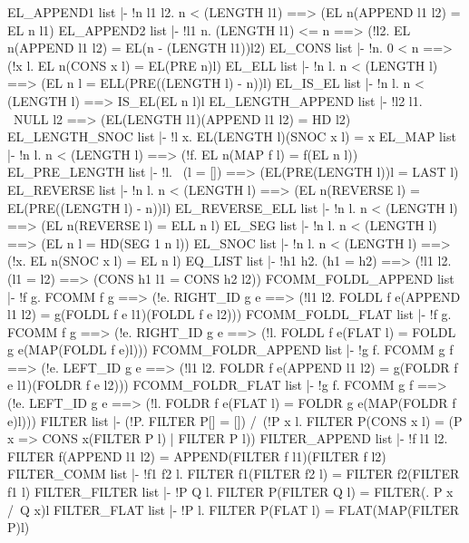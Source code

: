 \ENDTHEOREM
\THEOREM EL\_APPEND1 list
|- !n l1 l2. n < (LENGTH l1) ==> (EL n(APPEND l1 l2) = EL n l1)
\ENDTHEOREM
\THEOREM EL\_APPEND2 list
|- !l1 n.
    (LENGTH l1) <= n ==>
    (!l2. EL n(APPEND l1 l2) = EL(n - (LENGTH l1))l2)
\ENDTHEOREM
\THEOREM EL\_CONS list
|- !n. 0 < n ==> (!x l. EL n(CONS x l) = EL(PRE n)l)
\ENDTHEOREM
\THEOREM EL\_ELL list
|- !n l. n < (LENGTH l) ==> (EL n l = ELL(PRE((LENGTH l) - n))l)
\ENDTHEOREM
\THEOREM EL\_IS\_EL list
|- !n l. n < (LENGTH l) ==> IS_EL(EL n l)l
\ENDTHEOREM
\THEOREM EL\_LENGTH\_APPEND list
|- !l2 l1. ~NULL l2 ==> (EL(LENGTH l1)(APPEND l1 l2) = HD l2)
\ENDTHEOREM
\THEOREM EL\_LENGTH\_SNOC list
|- !l x. EL(LENGTH l)(SNOC x l) = x
\ENDTHEOREM
\THEOREM EL\_MAP list
|- !n l. n < (LENGTH l) ==> (!f. EL n(MAP f l) = f(EL n l))
\ENDTHEOREM
\THEOREM EL\_PRE\_LENGTH list
|- !l. ~(l = []) ==> (EL(PRE(LENGTH l))l = LAST l)
\ENDTHEOREM
\THEOREM EL\_REVERSE list
|- !n l. n < (LENGTH l) ==> (EL n(REVERSE l) = EL(PRE((LENGTH l) - n))l)
\ENDTHEOREM
\THEOREM EL\_REVERSE\_ELL list
|- !n l. n < (LENGTH l) ==> (EL n(REVERSE l) = ELL n l)
\ENDTHEOREM
\THEOREM EL\_SEG list
|- !n l. n < (LENGTH l) ==> (EL n l = HD(SEG 1 n l))
\ENDTHEOREM
\THEOREM EL\_SNOC list
|- !n l. n < (LENGTH l) ==> (!x. EL n(SNOC x l) = EL n l)
\ENDTHEOREM
\THEOREM EQ\_LIST list
|- !h1 h2.
    (h1 = h2) ==> (!l1 l2. (l1 = l2) ==> (CONS h1 l1 = CONS h2 l2))
\ENDTHEOREM
\THEOREM FCOMM\_FOLDL\_APPEND list
|- !f g.
    FCOMM f g ==>
    (!e.
      RIGHT_ID g e ==>
      (!l1 l2. FOLDL f e(APPEND l1 l2) = g(FOLDL f e l1)(FOLDL f e l2)))
\ENDTHEOREM
\THEOREM FCOMM\_FOLDL\_FLAT list
|- !f g.
    FCOMM f g ==>
    (!e.
      RIGHT_ID g e ==>
      (!l. FOLDL f e(FLAT l) = FOLDL g e(MAP(FOLDL f e)l)))
\ENDTHEOREM
\THEOREM FCOMM\_FOLDR\_APPEND list
|- !g f.
    FCOMM g f ==>
    (!e.
      LEFT_ID g e ==>
      (!l1 l2. FOLDR f e(APPEND l1 l2) = g(FOLDR f e l1)(FOLDR f e l2)))
\ENDTHEOREM
\THEOREM FCOMM\_FOLDR\_FLAT list
|- !g f.
    FCOMM g f ==>
    (!e.
      LEFT_ID g e ==>
      (!l. FOLDR f e(FLAT l) = FOLDR g e(MAP(FOLDR f e)l)))
\ENDTHEOREM
\THEOREM FILTER list
|- (!P. FILTER P[] = []) /\
   (!P x l.
     FILTER P(CONS x l) = (P x => CONS x(FILTER P l) | FILTER P l))
\ENDTHEOREM
\THEOREM FILTER\_APPEND list
|- !f l1 l2. FILTER f(APPEND l1 l2) = APPEND(FILTER f l1)(FILTER f l2)
\ENDTHEOREM
\THEOREM FILTER\_COMM list
|- !f1 f2 l. FILTER f1(FILTER f2 l) = FILTER f2(FILTER f1 l)
\ENDTHEOREM
\THEOREM FILTER\_FILTER list
|- !P Q l. FILTER P(FILTER Q l) = FILTER(\x. P x /\ Q x)l
\ENDTHEOREM
\THEOREM FILTER\_FLAT list
|- !P l. FILTER P(FLAT l) = FLAT(MAP(FILTER P)l)
\ENDTHEOREM
